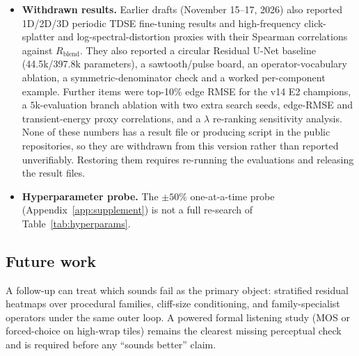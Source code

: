 \begin{itemize}
  \item \textbf{Withdrawn results.}
    Earlier drafts (November 15--17, 2026) also reported 1D/2D/3D periodic TDSE fine-tuning results and high-frequency click-splatter and log-spectral-distortion proxies with their Spearman correlations against $R_{\mathrm{blend}}$. They also reported a circular Residual U-Net baseline (44.5k/397.8k parameters), a sawtooth/pulse board, an operator-vocabulary ablation, a symmetric-denominator check and a worked per-component example. Further items were top-10\% edge RMSE for the v14 E2 champions, a $5$k-evaluation branch ablation with two extra search seeds, edge-RMSE and transient-energy proxy correlations, and a $\lambda$ re-ranking sensitivity analysis.
    None of these numbers has a result file or producing script in the public repositories, so they are withdrawn from this version rather than reported unverifiably. Restoring them requires re-running the evaluations and releasing the result files.
  \item \textbf{Hyperparameter probe.}
    The $\pm 50\%$ one-at-a-time probe (Appendix~\ref{app:supplement}) is not a full re-search of Table~\ref{tab:hyperparams}.
\end{itemize}

\subsection{Future work}
\label{sec:outlook}

A follow-up can treat which sounds fail as the primary object: stratified residual heatmaps over procedural families, cliff-size conditioning, and family-specialist operators under the same outer loop.
A powered formal listening study (MOS or forced-choice on high-wrap tiles) remains the clearest missing perceptual check and is required before any ``sounds better'' claim.
